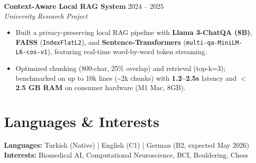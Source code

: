 \documentclass[a4paper,9.5pt]{extarticle}
\begin{document}
\textbf{Context-Aware Local RAG System} \hfill 2024 -- 2025\\
\textit{University Research Project}
\begin{itemize}[leftmargin=*, itemsep=0pt, topsep=1pt, parsep=0pt]
    \item Built a privacy-preserving local RAG pipeline with \textbf{Llama 3-ChatQA (8B)}, \textbf{FAISS} (\texttt{IndexFlatL2}), and \textbf{Sentence-Transformers} (\texttt{multi-qa-MiniLM-L6-cos-v1}), featuring real-time word-by-word token streaming.
    \item Optimized chunking (800-char, 25\% overlap) and retrieval (top-k=3); benchmarked on up to 10k lines (\textasciitilde 2k chunks) with \textbf{1.2--2.5s} latency and \textbf{$<$2.5 GB RAM} on consumer hardware (M1 Mac, 8GB).
\end{itemize}

\section*{Languages \& Interests}
\textbf{Languages:} Turkish (Native) \;|\; English (C1) \;|\; German (B2, expected May 2026)
\quad \textbf{Interests:} Biomedical AI, Computational Neuroscience, BCI, Bouldering, Chess
\end{document}
